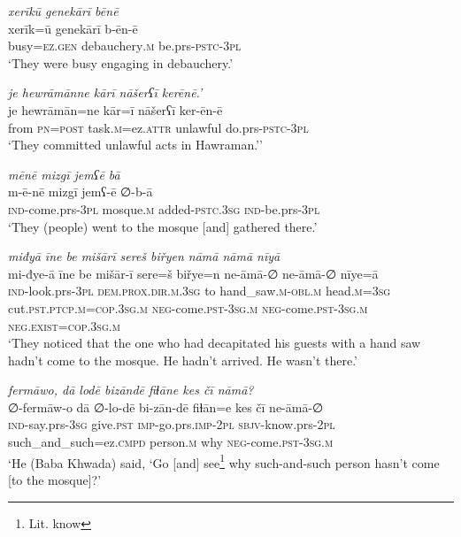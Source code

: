\ea \label{BP.61}
\textit{xerīkū genekārī bēnē} \\ 
\gll xerīk=ū genekārī b-ēn-ē \\ 
 busy\textsc{=ez.gen} debauchery\textsc{.m} be.prs\textsc{-pstc}\textsc{-3pl} \\ 
\glt `They were busy engaging in debauchery.'
\z 
 
\ea \label{BP.62}
\textit{je hewrāmānne kārī nāšerʕī kerēnē.’} \\ 
\gll je hewrāmān=ne kār=ī nāšerʕī ker-ēn-ē \\ 
 from \textsc{pn}\textsc{=\textsc{post}} task\textsc{.m}=ez.\textsc{attr} unlawful do.prs\textsc{-pstc}\textsc{-3pl} \\ 
\glt `They committed unlawful acts in Hawraman.’'
\z 
 
\ea \label{BP.75}
\textit{mēnē mizgī jemʕē bā} \\ 
\gll m-ē-nē mizgī jemʕ-ē ∅-b-ā \\ 
 \textsc{ind-}come.prs\textsc{-3pl} mosque\textsc{.m} added\textsc{-pstc}\textsc{.3sg} \textsc{ind-}be.prs\textsc{-3pl} \\ 
\glt `They (people) went to the mosque [and] gathered there.'
\z 
 
\ea \label{BP.76}
\textit{miđyā īne be mišārī sereš biřyen nāmā nāmā nīyā} \\ 
\gll mi-đye-ā īne be mišār-ī sere=š biřye=n ne-āmā-∅ ne-āmā-∅ nīye=ā \\ 
 \textsc{ind-}look.prs\textsc{-3pl} \textsc{dem.prox}\textsc{.dir}\textsc{.m}\textsc{.3sg} to hand\_saw\textsc{.m}\textsc{-obl}\textsc{.m} head\textsc{.m}\textsc{=3sg} cut\textsc{.pst}\textsc{.ptcp}\textsc{.m}\textsc{=cop}\textsc{.3sg}\textsc{.m} \textsc{neg-}come\textsc{.pst}\textsc{-3sg}\textsc{.m} \textsc{neg-}come\textsc{.pst}\textsc{-3sg}\textsc{.m} \textsc{\textsc{neg.}exist}\textsc{=cop}\textsc{.3sg}\textsc{.m} \\ 
\glt `They noticed that the one who had decapitated his guests with a hand saw hadn’t come to the mosque. He hadn’t arrived. He wasn’t there.'
\z 
 
\ea \label{BP.77}
\textit{fermāwo, dā lodē bizāndē fiɫāne kes čī nāmā?} \\ 
\gll ∅-fermāw-o dā ∅-lo-dē bi-zān-dē fiɫān=e kes čī ne-āmā-∅ \\ 
 \textsc{ind-}say.prs\textsc{-3sg} give\textsc{.pst} \textsc{imp-}go.prs.\textsc{imp-}\textsc{2pl} \textsc{sbjv-}know.prs-\textsc{2pl} such\_and\_such=ez\textsc{.cmpd} person\textsc{.m} why \textsc{neg-}come\textsc{.pst}\textsc{-3sg}\textsc{.m} \\ 
\glt `He (Baba Khwada) said, ‘Go [and] see\footnote{Lit. know} why such-and-such person hasn’t come [to the mosque]?'
\z 
 
